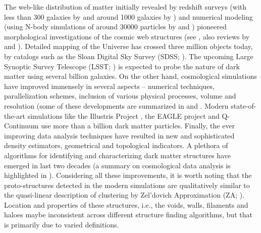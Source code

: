 The web-like distribution of matter initially revealed by redshift surveys (with less than 300 galaxies by \citealt{Gregory1978} and around 1000 galaxies by \citealt{Lapparent1986}) and numerical modeling (using N-body simulations of around 30000 particles by \citealt{Shandarin1983} and \citealt{Klypin1983a}) pioneered morphological investigations of the cosmic web structures (see \citealt{Bond1996}, also reviews by \citealt{Shandarin1989} and \citealt{Weygaert2008}). Detailed mapping of the Universe has crossed three million objects today, by catalogs such as the Sloan Digital Sky Survey (SDSS; \citealt{Albareti2016}). The upcoming Large Synoptic Survey Telescope (LSST; \citealt{lsst2009}) is expected to probe the nature of dark matter using several billion galaxies. On the other hand, cosmological simulations have improved immensely in several aspects -- numerical techniques, parallelization schemes, inclusion of various physical processes, volume and resolution (some of these developments are summarized in \cite{Bertschinger1998} and \cite{Bagla1997}. Modern state-of-the-art simulations like the Illustris Project \cite{Vogelsberger2014}, the EAGLE project \cite{Schaye2015} and Q-Continuum \cite{Heitmann2015} use more than a billion dark matter particles. Finally, the ever improving data analysis techniques have resulted in new and sophisticated density estimators, geometrical and topological indicators. A plethora of algorithms for identifying and characterizing dark matter structures have emerged in last two decades (a summary on cosmological data analysis is highlighted in \citealt{Weygaert2009a}). Considering all these improvements, it is worth noting that the proto-structures detected in the modern simulations are qualitatively similar to the quasi-linear description of clustering by Zel'dovich Approximation (ZA; \citealt{Zeldovich1970}). Location and properties of these structures, i.e., the voids, walls, filaments and haloes maybe inconsistent across different structure finding algorithms, but that is primarily due to varied definitions. 


